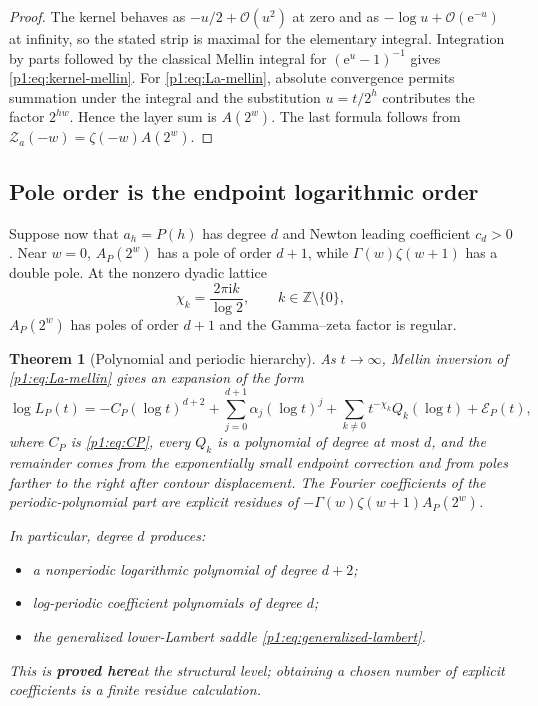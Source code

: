 \documentclass[11pt,oneside]{article}
\numberwithin{equation}{section}
\newtheorem{theorem}{Theorem}[section]
\theoremstyle{definition}
\theoremstyle{remark}
\newcommand{\Z}{\mathbb Z}
\newcommand{\e}{\mathrm e}
\newcommand{\ii}{\mathrm i}
\newcommand{\bigO}{\mathcal O}
\newcommand{\statusproved}{\textcolor{deepgreen}{\textbf{proved here}}}
\newcommand{\Zspec}{\mathcal Z}
\begin{document}
\begin{proof}
The kernel behaves as $-u/2+\bigO(u^2)$ at zero and as $-\log u+\bigO(\e^{-u})$ at infinity,
so the stated strip is maximal for the elementary integral.  Integration by parts followed
by the classical Mellin integral for $(\e^u-1)^{-1}$ gives
\eqref{p1:eq:kernel-mellin}.  For \eqref{p1:eq:La-mellin}, absolute convergence permits summation
under the integral and the substitution $u=t/2^h$ contributes the factor $2^{hw}$.
Hence the layer sum is $A(2^w)$.  The last formula follows from
$\Zspec_a(-w)=\zeta(-w)A(2^w)$.
\end{proof}

\subsection{Pole order is the endpoint logarithmic order}

Suppose now that $a_h=P(h)$ has degree $d$ and Newton leading coefficient $c_d>0$.  Near
$w=0$, $A_P(2^w)$ has a pole of order $d+1$, while
$\Gamma(w)\zeta(w+1)$ has a double pole.  At the nonzero dyadic lattice
\begin{equation}
 \chi_k=\frac{2\pi\ii k}{\log2},
 \qquad k\in\Z\setminus\{0\},
 \label{p1:eq:dyadic-lattice}
\end{equation}
$A_P(2^w)$ has poles of order $d+1$ and the Gamma--zeta factor is regular.

\begin{theorem}[Polynomial and periodic hierarchy]
\label{p1:thm:pole-hierarchy}
As $t\to\infty$, Mellin inversion of \eqref{p1:eq:La-mellin} gives an expansion of the form
\begin{equation}
 \log L_P(t)
 =-C_P(\log t)^{d+2}
  +\sum_{j=0}^{d+1}\alpha_j(\log t)^j
  +\sum_{k\ne0}t^{-\chi_k}Q_k(\log t)
  +\mathcal E_P(t),
 \label{p1:eq:logLP-structure}
\end{equation}
where $C_P$ is \eqref{p1:eq:CP}, every $Q_k$ is a polynomial of degree at most $d$, and the
remainder comes from the exponentially small endpoint correction and from poles farther to
the right after contour displacement.  The Fourier coefficients of the periodic-polynomial
part are explicit residues of
$-\Gamma(w)\zeta(w+1)A_P(2^w)$.

In particular, degree $d$ produces:
\begin{itemize}
\item a nonperiodic logarithmic polynomial of degree $d+2$;
\item log-periodic coefficient polynomials of degree $d$;
\item the generalized lower-Lambert saddle \eqref{p1:eq:generalized-lambert}.
\end{itemize}
This is \statusproved at the structural level; obtaining a chosen number of explicit
coefficients is a finite residue calculation.
\end{theorem}
\end{document}
